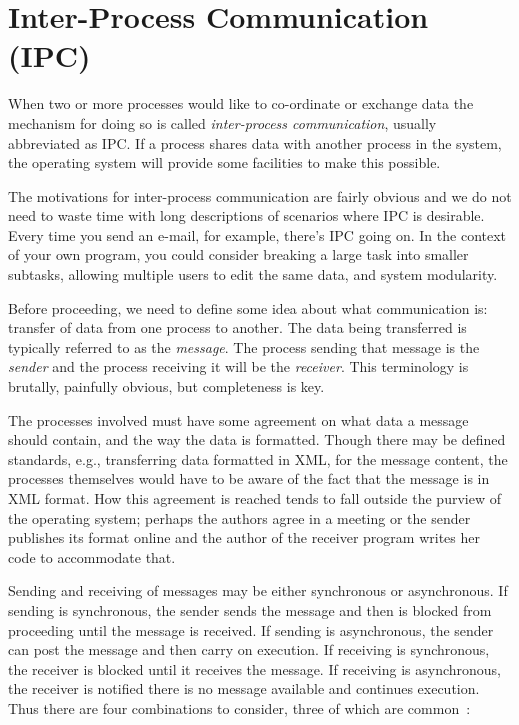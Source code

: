 




\section*{Inter-Process Communication (IPC)}
When two or more processes would like to co-ordinate or exchange data the mechanism for doing so is called \textit{inter-process communication}, usually abbreviated as IPC. If a process shares data with another process in the system, the operating system will provide some facilities to make this possible.

The motivations for inter-process communication are fairly obvious and we do not need to waste time with long descriptions of scenarios where IPC is desirable. Every time you send an e-mail, for example, there's IPC going on. In the context of your own program, you could consider breaking a large task into smaller subtasks, allowing multiple users to edit the same data, and system modularity.

Before proceeding, we need to define some idea about what communication is: transfer of data from one process to another. The data being transferred is typically referred to as the \textit{message}. The process sending that message is the \textit{sender} and the process receiving it will be the \textit{receiver}. This terminology is brutally, painfully obvious, but completeness is key.

The processes involved must have some agreement on what data a message should contain, and the way the data is formatted. Though there may be defined standards, e.g., transferring data formatted in XML, for the message content, the processes themselves would have to be aware of the fact that the message is in XML format. How this agreement is reached tends to fall outside the purview of the operating system; perhaps the authors agree in a meeting or the sender publishes its format online and the author of the receiver program writes her code to accommodate that.

Sending and receiving of messages may be either synchronous or asynchronous. If sending is synchronous, the sender sends the message and then is blocked from proceeding until the message is received. If sending is asynchronous, the sender can post the message and then carry on execution. If receiving is synchronous, the receiver is blocked until it receives the message. If receiving is asynchronous, the receiver is notified there is no message available and continues execution. Thus there are four combinations to consider, three of which are common~\cite{mte241}:

